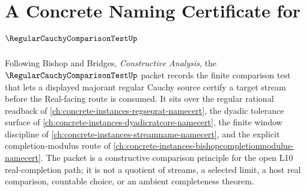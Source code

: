 \chapter{A Concrete Naming Certificate for $\RegularCauchyComparisonTestUp$}
\label{ch:concrete-instances-regular-cauchy-comparison-test-namecert}

Following Bishop and Bridges, \emph{Constructive Analysis}, the $\RegularCauchyComparisonTestUp$ packet records the finite comparison test that lets a displayed majorant regular Cauchy source certify a target stream before the Real-facing route is consumed. It sits over the regular rational readback of \autoref{ch:concrete-instances-regseqrat-namecert}, the dyadic tolerance surface of \autoref{ch:concrete-instances-dyadicratcore-namecert}, the finite window discipline of \autoref{ch:concrete-instances-streamname-namecert}, and the explicit completion-modulus route of \autoref{ch:concrete-instances-bishopcompletionmodulus-namecert}. The packet is a constructive comparison principle for the open L10 real-completion path; it is not a quotient of streams, a selected limit, a host real comparison, countable choice, or an ambient completeness theorem.

